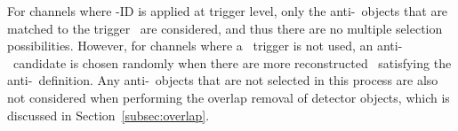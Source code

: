 For channels where \tauhad-ID is applied at trigger level, only the anti-\tauhad\ objects that are matched to the trigger \tauhad\ are considered, and thus there are no multiple selection possibilities. However, for channels where a \tauhad\ trigger is not used, an anti-\tauhad\ candidate is chosen randomly when there are more reconstructed \tauhad\ satisfying the anti-\tauhad\ definition. Any anti-\tauhad\ objects that are not selected in this process are also not considered when performing the overlap removal of detector objects, which is discussed in Section~\ref{subsec:overlap}.